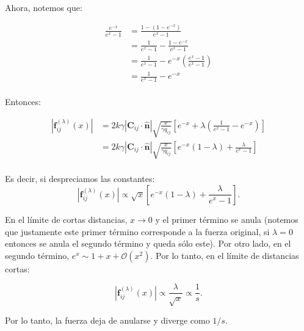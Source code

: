 \documentclass[11pt,a4paper]{article}
\begin{document}
Ahora, notemos que:

\begin{equation}
	\begin{split}
		\frac{e^{-x}}
		{e^{x}-1}
		&= \frac{1-(1-e^{-x})}
		{e^{x}-1} \\
		&= \frac{1}
		{e^{x}-1}-\frac{1-e^{-x}}
		{e^{x}-1}\\
		&= \frac{1}
		{e^{x}-1}-e^{-x}\left(\frac{e^{x}-1}
		{e^{x}-1}\right)\\
		&= \frac{1}
		{e^{x}-1}-e^{-x}\\
	\end{split}
\end{equation}

Entonces:

\begin{equation}
	\begin{split}
		\left|\mathbf{ f}_{ij}^{(\lambda)}(x)\right|
		&= 2k\gamma
		\left|\mathbf C_{ij}\cdot\hat{\mathbf n}\right|
		\sqrt{\frac{x}{\gamma q_{ij}}} 
		\left[
		e^{-x}
		+
		\lambda
		\left(\frac{1}
		{e^{x}-1}-e^{-x}\right)
		\right] \\
		&= 2k\gamma
		\left|\mathbf C_{ij}\cdot\hat{\mathbf n}\right|
		\sqrt{\frac{x}{\gamma q_{ij}}} 
		\left[
		e^{-x}(1-\lambda)
		+
		\frac{\lambda}
		{e^{x}-1}
		\right]\\
	\end{split}
\end{equation}

Es decir, si despreciamos las constantes:
\begin{equation}
	\left|\mathbf{ f}_{ij}^{(\lambda)}(x)\right|
	\propto 
	\sqrt{x} 
	\left[
	e^{-x}(1-\lambda)
	+
	\frac{\lambda}
	{e^{x}-1}
	\right].
\end{equation}

En el límite de cortas distancias, $x \rightarrow 0$ y el primer término se anula (notemos que justamente este primer término corresponde a la fuerza original, si $\lambda=0$ entonces se anula el segundo término y queda sólo este). Por otro lado, en el segundo término, $e^{x}\sim 1 + x +\mathcal{O}(x^{2})$. Por lo tanto, en el límite de distancias cortas:

\begin{equation}
	\left|\mathbf{ f}_{ij}^{(\lambda)}(x)\right|
	\propto 
	\frac{\lambda}
	{\sqrt{x}}\propto\frac{1}{s}.
\end{equation}

Por lo tanto, la fuerza deja de anularse y diverge como $1/s$.
\end{document}
